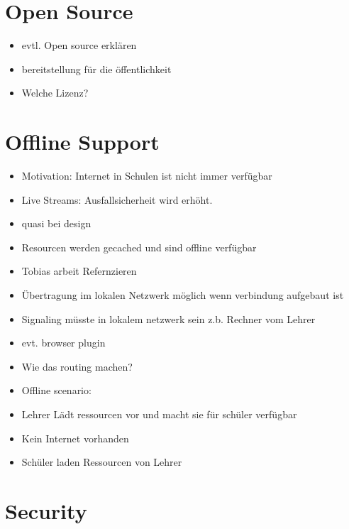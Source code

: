 \section{Open Source}
\begin{itemize}
	\item evtl. Open source erklären
	\item bereitstellung für die öffentlichkeit
	\item Welche Lizenz?
\end{itemize}
%

\section{Offline Support}
\begin{itemize}
	\item Motivation: Internet in Schulen ist nicht immer verfügbar
	\item Live Streams: Ausfallsicherheit wird erhöht.
	\item quasi bei design
	\item Resourcen werden gecached und sind offline verfügbar
	\item Tobias arbeit Refernzieren
	\item Übertragung im lokalen Netzwerk möglich wenn verbindung aufgebaut ist
	\item Signaling müsste in lokalem netzwerk sein z.b. Rechner vom Lehrer
	\item 	evt. browser plugin
	\item 	Wie das routing machen?
	\item Offline scenario:
	\item 	Lehrer Lädt ressourcen vor und macht sie für schüler verfügbar
	\item 	Kein Internet vorhanden
	\item 	Schüler laden Ressourcen von Lehrer
\end{itemize}

\section{Security}

